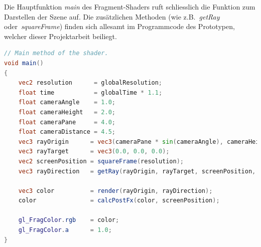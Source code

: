 Die Hauptfunktion \textit{main} des Fragment-Shaders ruft schliesslich
die Funktion zum Darstellen der Szene auf. Die zusätzlichen Methoden
(wie z.B.~\textit{getRay} oder~\textit{squareFrame}) finden sich
allesamt im Programmcode des Prototypen, welcher dieser Projektarbeit
beiliegt.

\begin{lstlisting}[language=GLSL,caption={Einstiegspunkt des
        Fragment-Shaders.},
    label={alg:glsl_main},captionpos=b,emph={main}]
// Main method of the shader.
void main()
{
    vec2 resolution      = globalResolution;
    float time           = globalTime * 1.1;
    float cameraAngle    = 1.0;
    float cameraHeight   = 2.0;
    float cameraPane     = 4.0;
    float cameraDistance = 4.5;
    vec3 rayOrigin      = vec3(cameraPane * sin(cameraAngle), cameraHeight, cameraDistance * cos(cameraAngle * time));
    vec3 rayTarget      = vec3(0.0, 0.0, 0.0);
    vec2 screenPosition = squareFrame(resolution);
    vec3 rayDirection   = getRay(rayOrigin, rayTarget, screenPosition, 2.0);

    vec3 color          = render(rayOrigin, rayDirection);
    color               = calcPostFx(color, screenPosition);

    gl_FragColor.rgb    = color;
    gl_FragColor.a      = 1.0;
}
\end{lstlisting}
